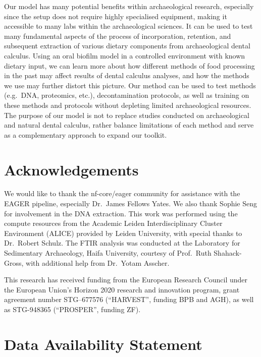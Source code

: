 \documentclass[
]{article}
\begin{document}
Our model has many potential benefits within archaeological research,
especially since the setup does not require highly specialised
equipment, making it accessible to many labs within the archaeological
sciences. It can be used to test many fundamental aspects of the process
of incorporation, retention, and subsequent extraction of various
dietary components from archaeological dental calculus. Using an oral
biofilm model in a controlled environment with known dietary input, we
can learn more about how different methods of food processing in the
past may affect results of dental calculus analyses, and how the methods
we use may further distort this picture. Our method can be used to test
methods (e.g.~DNA, proteomics, etc.), decontamination protocols, as well
as training on these methods and protocols without depleting limited
archaeological resources. The purpose of our model is not to replace
studies conducted on archaeological and natural dental calculus, rather
balance limitations of each method and serve as a complementary approach
to expand our toolkit.

\hypertarget{acknowledgements}{%
\section*{Acknowledgements}\label{acknowledgements}}

We would like to thank the nf-core/eager community for assistance with
the EAGER pipeline, especially Dr.~James Fellows Yates. We also thank
Sophie Seng for involvement in the DNA extraction. This work was
performed using the compute resources from the Academic Leiden
Interdisciplinary Cluster Environment (ALICE) provided by Leiden
University, with special thanks to Dr.~Robert Schulz. The FTIR analysis
was conducted at the Laboratory for Sedimentary Archaeology, Haifa
University, courtesy of Prof.~Ruth Shahack-Gross, with additional help
from Dr.~Yotam Asscher.

This research has received funding from the European Research Council
under the European Union's Horizon 2020 research and innovation program,
grant agreement number STG--677576 (``HARVEST'', funding BPB and AGH),
as well as STG-948365 (``PROSPER'', funding ZF).

\hypertarget{data-availability-statement}{%
\section*{Data Availability
Statement}\label{data-availability-statement}}
\end{document}
